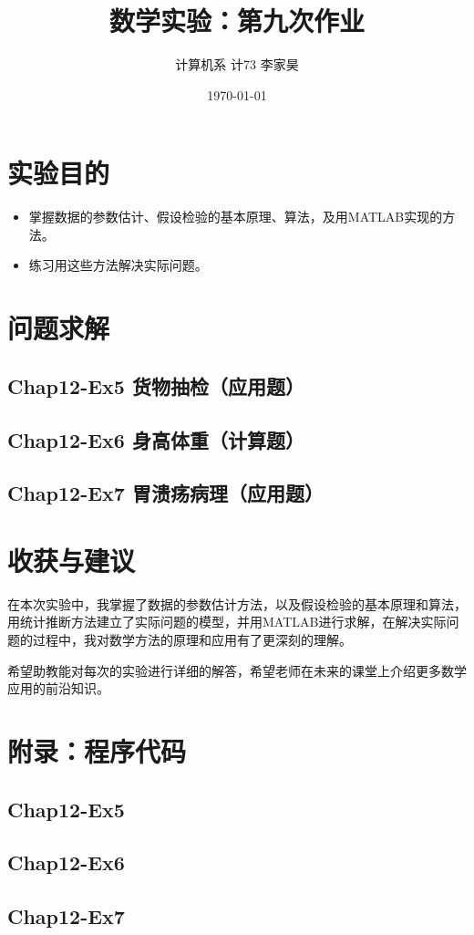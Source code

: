 \documentclass[12pt,a4paper]{article}
\title{数学实验：第九次作业}
\author{计算机系 \quad 计73 \quad 2017011620 \quad 李家昊}
\date{\today}
\begin{document}
\maketitle

\section{实验目的}

\begin{itemize}
    \item 掌握数据的参数估计、假设检验的基本原理、算法，及用MATLAB实现的方法。
    \item 练习用这些方法解决实际问题。
\end{itemize}

\section{问题求解}

\subsection{Chap12-Ex5 货物抽检（应用题）}



\subsection{Chap12-Ex6 身高体重（计算题）}



\subsection{Chap12-Ex7 胃溃疡病理（应用题）}



\section{收获与建议}

在本次实验中，我掌握了数据的参数估计方法，以及假设检验的基本原理和算法，用统计推断方法建立了实际问题的模型，并用MATLAB进行求解，在解决实际问题的过程中，我对数学方法的原理和应用有了更深刻的理解。

希望助教能对每次的实验进行详细的解答，希望老师在未来的课堂上介绍更多数学应用的前沿知识。

\section{附录：程序代码}

\subsection{Chap12-Ex5}\label{sec:ex5_code}



\subsection{Chap12-Ex6}\label{sec:ex6_code}



\subsection{Chap12-Ex7}\label{sec:ex7_code}


\end{document}

